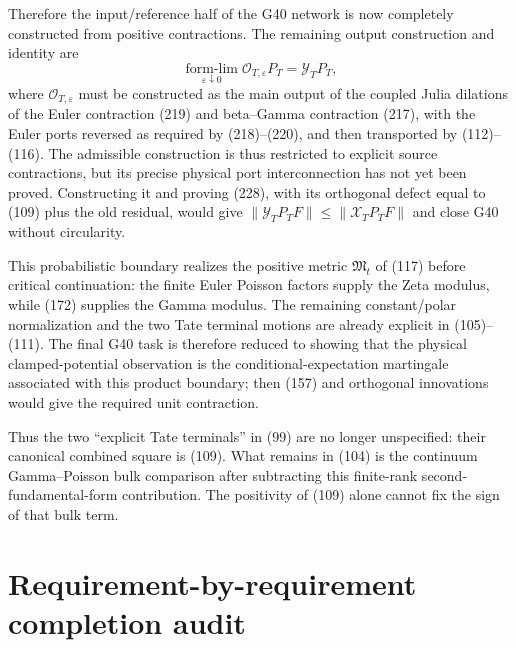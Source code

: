\documentclass[11pt]{article}
\begin{document}
Therefore the input/reference half of the G40 network is now completely
constructed from positive contractions.  The remaining output construction
and identity are
\begin{equation}
 \boxed{\quad
 \operatorname*{form-lim}_{\varepsilon\downarrow0}
 \mathcal O_{T,\varepsilon}P_T
 =\mathcal Y_TP_T,
 \quad}                                                \tag{228}
\end{equation}
where $\mathcal O_{T,\varepsilon}$ must be constructed as the main output of
the coupled Julia dilations of the Euler contraction (219) and beta--Gamma
contraction (217), with the Euler ports reversed as required by (218)--(220),
and then transported by (112)--(116).  The admissible construction is thus
restricted to explicit source contractions, but its precise physical port
interconnection has not yet been proved.  Constructing it and proving (228),
with its orthogonal defect equal to (109) plus the old residual, would give
$\|\mathcal Y_TP_TF\|\le\|\mathcal X_TP_TF\|$ and close G40 without
circularity.

This probabilistic boundary realizes the positive metric
$\mathfrak M_t$ of (117) before critical continuation: the finite Euler
Poisson factors supply the Zeta modulus, while (172) supplies the Gamma
modulus.  The remaining constant/polar normalization and the two Tate
terminal motions are already explicit in (105)--(111).  The final G40 task
is therefore reduced to showing that the physical clamped-potential
observation is the conditional-expectation martingale associated with this
product boundary; then (157) and orthogonal innovations would give the
required unit contraction.

Thus the two ``explicit Tate terminals'' in (99) are no longer unspecified:
their canonical combined square is (109).  What remains in (104) is the
continuum Gamma--Poisson bulk comparison after subtracting this finite-rank
second-fundamental-form contribution.  The positivity of (109) alone cannot
fix the sign of that bulk term.

\section{Requirement-by-requirement completion audit}
\end{document}
